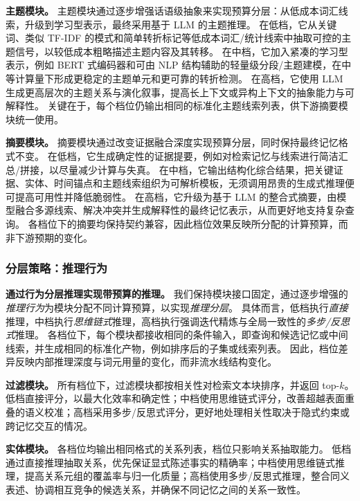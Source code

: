 \textbf{主题模块。}
主题模块通过逐步增强话语级抽象来实现预算分层：从低成本词汇线索，升级到学习型表示，最终采用基于 LLM 的主题推理。
在\textsc{低}档，它从关键词、类似 TF-IDF 的模式和简单转折标记等低成本词汇/统计线索中抽取可控的主题信号，以较低成本粗略描述主题内容及其转移。
在\textsc{中}档，它加入紧凑的学习型表示，例如 BERT 式编码器和可由 NLP 结构辅助的轻量级分段/主题建模，在中等计算量下形成更稳定的主题单元和更可靠的转折检测。
在\textsc{高}档，它使用 LLM 生成更高层次的主题关系与演化叙事，提高长上下文或异构上下文的抽象能力与可解释性。
关键在于，每个档位仍输出相同的标准化主题线索列表，供下游摘要模块统一使用。

\textbf{摘要模块。}
摘要模块通过改变证据融合深度实现预算分层，同时保持最终记忆格式不变。
在\textsc{低}档，它生成确定性的证据提要，例如对检索记忆与线索进行简洁汇总/拼接，以尽量减少计算与失真。
在\textsc{中}档，它输出结构化综合结果，把关键证据、实体、时间锚点和主题线索组织为可解析模板，无须调用昂贵的生成式推理便可提高可用性并降低脆弱性。
在\textsc{高}档，它升级为基于 LLM 的整合式摘要，由模型融合多源线索、解决冲突并生成解释性的最终记忆表示，从而更好地支持复杂查询。
各档位下的摘要均保持契约兼容，因此档位效果反映所分配的计算预算，而非下游预期的变化。

\subsubsection{分层策略：推理行为}

\textbf{通过行为分层推理实现带预算的推理。}
我们保持模块接口固定，通过逐步增强的\emph{推理行为}为模块分配不同计算预算，以实现\emph{推理分层}。
具体而言，\textsc{低}档执行\emph{直接}推理，\textsc{中}档执行\emph{思维链式}推理，\textsc{高}档执行强调迭代精炼与全局一致性的\emph{多步/反思式}推理。
各档位下，每个模块都接收相同的条件输入，即查询和候选记忆或中间线索，并生成相同的标准化产物，例如排序后的子集或线索列表。
因此，档位差异反映内部推理深度与词元用量的变化，而非流水线结构变化。

\textbf{过滤模块。}
所有档位下，过滤模块都按相关性对检索文本块排序，并返回 top-$k$。
\textsc{低}档直接评分，以最大化效率和确定性；\textsc{中}档使用思维链式评分，改善超越表面重叠的语义校准；\textsc{高}档采用多步/反思式评分，更好地处理相关性取决于隐式约束或跨记忆交互的情况。

\textbf{实体模块。}
各档位均输出相同格式的关系列表，档位只影响关系抽取能力。
\textsc{低}档通过直接推理抽取关系，优先保证显式陈述事实的精确率；\textsc{中}档使用思维链式推理，提高关系元组的覆盖率与归一化质量；\textsc{高}档使用多步/反思式推理，整合同义表述、协调相互竞争的候选关系，并确保不同记忆之间的关系一致性。

